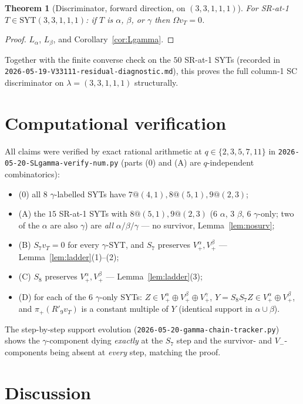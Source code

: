 \documentclass[11pt]{article}
\newtheorem{theorem}{Theorem}
\newcommand{\Vm}{V_{-}}
\newcommand{\Va}{V_{+}^{\alpha}}
\newcommand{\Vb}{V_{+}^{\beta}}
\newcommand{\Vg}{V_{+}^{\gamma}}
\begin{document}
\begin{theorem}[Discriminator, forward direction, on $(3,3,1,1,1)$]
For SR-at-1 $T\in\mathrm{SYT}(3,3,1,1,1)$: if $T$ is $\alpha$, $\beta$, or
$\gamma$ then $\Omega v_T = 0$.
\end{theorem}

\begin{proof}
$L_\alpha$, $L_\beta$, and Corollary~\ref{cor:Lgamma}.
\end{proof}

Together with the finite converse check on the $50$ SR-at-1 SYTs (recorded in
\texttt{2026-05-19-V33111-residual-diagnostic.md}), this proves the full
column-1 SC discriminator on $\lambda=(3,3,1,1,1)$ structurally.

\section{Computational verification}

All claims were verified by exact rational arithmetic at
$q\in\{2,3,5,7,11\}$ in \texttt{2026-05-20-SLgamma-verify-num.py} (parts (0)
and (A) are $q$-independent combinatorics):
\begin{itemize}
\item (0) all $8$ $\gamma$-labelled SYTs have $7@(4,1),8@(5,1),9@(2,3)$;
\item (A) the $15$ SR-at-1 SYTs with $8@(5,1),9@(2,3)$ ($6$ $\alpha$, $3$
  $\beta$, $6$ $\gamma$-only; two of the $\alpha$ are also $\gamma$) are
  \emph{all} $\alpha/\beta/\gamma$ --- no survivor, Lemma~\ref{lem:nosurv};
\item (B) $S_7 v_T=0$ for every $\gamma$-SYT, and $S_7$ preserves
  $\Va,\Vb$ --- Lemma~\ref{lem:ladder}(1)--(2);
\item (C) $S_8$ preserves $\Va,\Vb$ --- Lemma~\ref{lem:ladder}(3);
\item (D) for each of the $6$ $\gamma$-only SYTs: $Z\in\Va\oplus\Vb\oplus\Vg$,
  $Y=S_8S_7Z\in\Va\oplus\Vb$, and $\pi_+(R'_9v_T)$ is a constant multiple of
  $Y$ (identical support in $\alpha\cup\beta$).
\end{itemize}
The step-by-step support evolution
(\texttt{2026-05-20-gamma-chain-tracker.py}) shows the
$\gamma$-component dying \emph{exactly} at the $S_7$ step and the survivor- and
$\Vm$-components being absent at \emph{every} step, matching the proof.

\section{Discussion}
\end{document}
